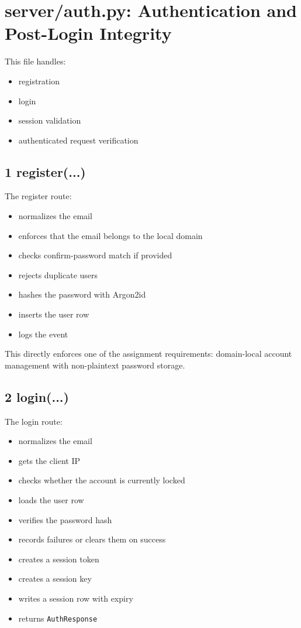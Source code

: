 \documentclass[11pt,a4paper]{article}
\begin{document}
\section{server/auth.py: Authentication and Post-Login Integrity}

This file handles:

\begin{itemize}
\item registration
\item login
\item session validation
\item authenticated request verification
\end{itemize}

\subsection{1 register(...)}

The register route:

\begin{itemize}
\item normalizes the email
\item enforces that the email belongs to the local domain
\item checks confirm-password match if provided
\item rejects duplicate users
\item hashes the password with Argon2id
\item inserts the user row
\item logs the event
\end{itemize}

This directly enforces one of the assignment requirements: domain-local account management with non-plaintext password storage.

\subsection{2 login(...)}

The login route:

\begin{itemize}
\item normalizes the email
\item gets the client IP
\item checks whether the account is currently locked
\item loads the user row
\item verifies the password hash
\item records failures or clears them on success
\item creates a session token
\item creates a session key
\item writes a session row with expiry
\item returns \nolinkurl{AuthResponse}
\end{itemize}
\end{document}

